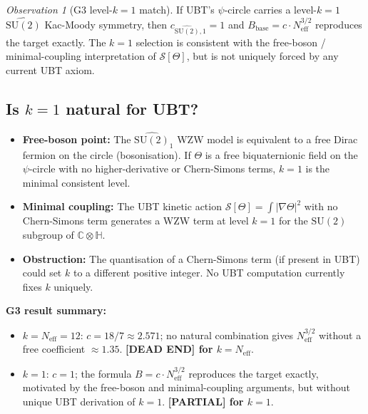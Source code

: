 \documentclass[11pt,a4paper]{article}
\theoremstyle{definition}
\theoremstyle{remark}
\newtheorem{observation}{Observation}
\begin{document}
\begin{observation}[G3 level-$k=1$ match]
  \label{obs:G3_k1}
  If UBT's $\psi$-circle carries a level-$k=1$
  $\widehat{\mathrm{SU}(2)}$ Kac-Moody symmetry, then
  $c_{\widehat{\mathrm{SU}(2)},1} = 1$ and
  $B_{\mathrm{base}} = c \cdot N_{\mathrm{eff}}^{3/2}$ reproduces
  the target exactly.
  The $k = 1$ selection is consistent with the free-boson / minimal-coupling
  interpretation of $\mathcal{S}[\Theta]$, but is not uniquely forced by any
  current UBT axiom.
\end{observation}

\subsection{Is $k = 1$ natural for UBT?}

\begin{itemize}
  \item \textbf{Free-boson point:}
    The $\widehat{\mathrm{SU}(2)}_1$ WZW model is equivalent to a free
    Dirac fermion on the circle (bosonisation).
    If $\Theta$ is a free biquaternionic field on the $\psi$-circle with no
    higher-derivative or Chern-Simons terms, $k = 1$ is the minimal
    consistent level.
  \item \textbf{Minimal coupling:}
    The UBT kinetic action $\mathcal{S}[\Theta] = \int |\nabla\Theta|^2$
    with no Chern-Simons term generates a WZW term at level $k = 1$
    for the $\mathrm{SU}(2)$ subgroup of $\mathbb{C}\otimes\mathbb{H}$.
  \item \textbf{Obstruction:}
    The quantisation of a Chern-Simons term (if present in UBT) could
    set $k$ to a different positive integer.
    No UBT computation currently fixes $k$ uniquely.
\end{itemize}

\textbf{G3 result summary:}
\begin{itemize}
  \item $k = N_{\mathrm{eff}} = 12$: $c = 18/7 \approx 2.571$;
    no natural combination gives $N_{\mathrm{eff}}^{3/2}$ without a
    free coefficient $\approx 1.35$.
    \textbf{[DEAD END] for $k = N_{\mathrm{eff}}$}.
  \item $k = 1$: $c = 1$; the formula $B = c \cdot N_{\mathrm{eff}}^{3/2}$
    reproduces the target exactly, motivated by the free-boson and
    minimal-coupling arguments, but without unique UBT derivation of $k = 1$.
    \textbf{[PARTIAL] for $k = 1$}.
\end{itemize}
\end{document}
